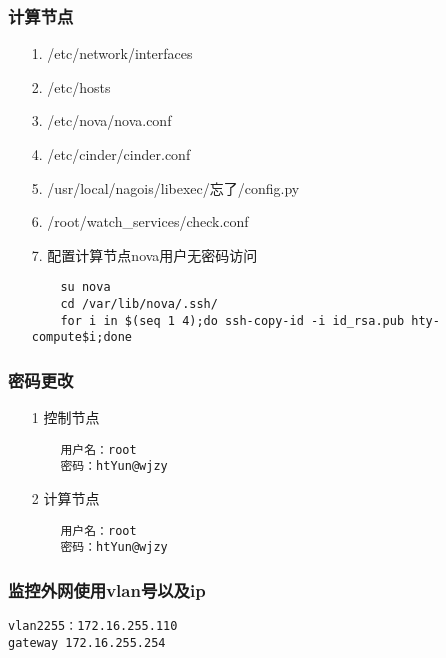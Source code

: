 \documentclass[a4paper,left=1.5cm,right=1.5cm,11pt]{article}
\begin{document}
\subsubsection{计算节点}
\begin{itemize}
	\item[1.]/etc/network/interfaces
	\item[2.]/etc/hosts
	\item[3.]/etc/nova/nova.conf
	\item[4.]/etc/cinder/cinder.conf
	\item[5.]/usr/local/nagois/libexec/忘了/config.py
	\item[6.]/root/watch\_services/check.conf
	\item[7.]配置计算节点nova用户无密码访问
	\begin{lstlisting}
	su nova
	cd /var/lib/nova/.ssh/
	for i in $(seq 1 4);do ssh-copy-id -i id_rsa.pub hty-compute$i;done
	\end{lstlisting}
\end{itemize}
\subsubsection{密码更改}
\begin{itemize}
	\item[1]控制节点
	\begin{lstlisting}
	用户名：root
	密码：htYun@wjzy
	\end{lstlisting}
	\item[2]计算节点
	\begin{lstlisting}
	用户名：root
	密码：htYun@wjzy
	\end{lstlisting}
\end{itemize}
\subsubsection{监控外网使用vlan号以及ip}
\begin{lstlisting}
vlan2255：172.16.255.110
gateway 172.16.255.254
\end{lstlisting}
\end{document}
